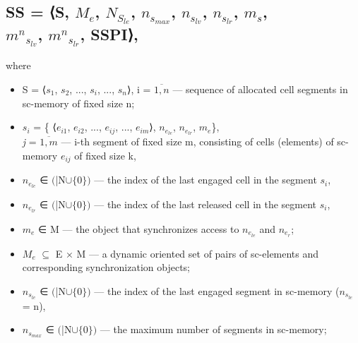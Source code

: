 \documentclass{article}
\begin{document}
\begin{multicols}{2}
\begin{center}
   \section*{ \textmd{\normalsize{{SS = ⟨S, $ M_e $, $N_{S_{le}}$, $n_{s_{max}}$, $n_{s_{lv}}$, $n_{s_{lr}}$, $ m_s$,\\ $m^n{}_{s{}_{lv}}$, $m^n{}_{s{}_{lr}}$, SSPI⟩,}}}}
\end{center}
where
\begin{itemize} 
\item S = ⟨$s_1$, $s_2$, ..., $s_i$, ..., $s_n$⟩, i = $\overline{1, n}$ — sequence
of allocated cell segments in sc-memory of fixed
size n;
\item $s_i$ = \{ ⟨$e_{i1}$, $e_{i2}$, ..., $e_{ij}$, ..., $e_{im}$⟩, $n_{e_{le}}$, $n_{e_{lr}}$, $m_e$\},    \\ \textit{j} = $\overline{1, m}$ — i-th segment of fixed size m,
consisting of cells (elements) of sc-memory $e_{ij}$ of
fixed size k,
\item $n_{e_{le}}$ ∈ $($\bar N$ \cup  \{0\})$ — the index of the last engaged
cell in the segment $s_i$,
\item $n_{e_{lr}}$ ∈ $($\bar N$ \cup  \{0\})$ — the index of the last released
cell in the segment $s_i$,
\item $m_e$ ∈ M — the object that synchronizes access to
$n_{e_{le}}$ and $n_{e_{r}}$;
\item $M_e$ $\subseteq$ E × M — a dynamic oriented set of pairs
of sc-elements and corresponding synchronization
objects;
\item  $n_{s_{le}}$ ∈ $($\bar N$ \cup  \{0\})$ — the index of the last engaged
segment in sc-memory ($n_{s_{le}}$ = n),
\item   $n_{s_{max}}$ ∈ $($\bar N$ \cup  \{0\})$ — the maximum number of
segments in sc-memory;

\end{itemize}
\end{multicols}
\end{document}
